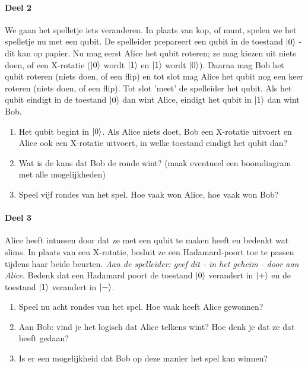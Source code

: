 \documentclass[../../main.tex]{subfiles}
\begin{document}
\paragraph*{Deel 2}
We gaan het spelletje iets veranderen. In plaats van kop, of munt, spelen we het spelletje nu met een qubit. De spelleider prepareert een qubit in de toestand $\ket{0}$ - dit kan op papier. Nu mag eerst Alice het qubit roteren; ze mag kiezen uit niets doen, of een X-rotatie ($\ket{0}$ wordt $\ket{1}$ en $\ket{1}$ wordt $\ket{0}$). Daarna mag Bob het qubit roteren (niets doen, of een flip) en tot slot mag Alice het qubit nog een keer roteren (niets doen, of een flip). Tot slot 'meet' de spelleider het qubit. Als het qubit eindigt in de toestand $\ket{0}$ dan wint Alice, eindigt het qubit in $\ket{1}$ dan wint Bob.

\begin{enumerate}
\item Het qubit begint in $\ket{0}$. Als Alice niets doet, Bob een X-rotatie uitvoert en Alice ook een X-rotatie uitvoert, in welke toestand eindigt het qubit dan?
\item Wat is de kans dat Bob de ronde wint? (maak eventueel een boomdiagram met alle mogelijkheden)
\item Speel vijf rondes van het spel. Hoe vaak won Alice, hoe vaak won Bob?
\end{enumerate}

\paragraph*{Deel 3}
Alice heeft intussen door dat ze met een qubit te maken heeft en bedenkt wat slims. In plaats van een X-rotatie, besluit ze een Hadamard-poort toe te passen tijdens haar beide beurten. \textit{Aan de spelleider: geef dit - in het geheim - door aan Alice}. 
Bedenk dat een Hadamard poort de toestand $\ket{0}$ verandert in $\ket{+}$ en de toestand $\ket{1}$ verandert in $\ket{-}$.
\begin{enumerate}
\item Speel nu acht rondes van het spel. Hoe vaak heeft Alice gewonnen?
\item Aan Bob: vind je het logisch dat Alice telkens wint? Hoe denk je dat ze dat heeft gedaan?
\item Is er een mogelijkheid dat Bob op deze manier het spel kan winnen?
\end{enumerate}
\end{document}
